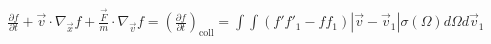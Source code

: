 \noindent\begin{align}\label{equ:relativisticBoltzmannTransport}
	\frac{\partial f}{\partial t} + \vec{v} \cdot \nabla_{\vec{x}} f + \frac{\vec{F}}{m} \cdot \nabla_{\vec{v}} f = \left(\frac{\partial f}{\partial t}\right)_{\text{coll}} = \int\int (f'f'_1 - ff_1)|\vec{v}-\vec{v}_1|\sigma(\Omega)d\Omega d\vec{v}_1
\end{align}

